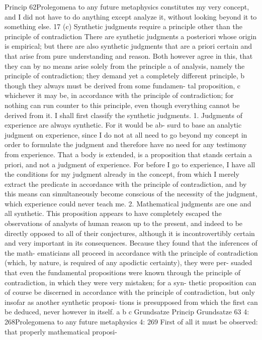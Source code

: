 Princip
62Prolegomena to any future metaphysics
constitutes my very concept, and I did not have to do anything except
analyze it, without looking beyond it to something else. 17
(c) Synthetic judgments require a principle other than
the principle of contradiction
There are synthetic judgments a posteriori whose origin is empirical; but
there are also synthetic judgments that are a priori certain and that arise
from pure understanding and reason. Both however agree in this, that
they can by no means arise solely from the principle a of analysis, namely
the principle of contradiction; they demand yet a completely different
principle, b though they always must be derived from some fundamen-
tal proposition, c whichever it may be, in accordance with the principle of
contradiction; for nothing can run counter to this principle, even though
everything cannot be derived from it. I shall ﬁrst classify the synthetic
judgments.
1. Judgments of experience are always synthetic. For it would be ab-
surd to base an analytic judgment on experience, since I do not at all
need to go beyond my concept in order to formulate the judgment and
therefore have no need for any testimony from experience. That a body is
extended, is a proposition that stands certain a priori, and not a judgment
of experience. For before I go to experience, I have all the conditions
for my judgment already in the concept, from which I merely extract
the predicate in accordance with the principle of contradiction, and by
this means can simultaneously become conscious of the necessity of the
judgment, which experience could never teach me.
2. Mathematical judgments are one and all synthetic. This proposition
appears to have completely escaped the observations of analysts of human
reason up to the present, and indeed to be directly opposed to all of their
conjectures, although it is incontrovertibly certain and very important
in its consequences. Because they found that the inferences of the math-
ematicians all proceed in accordance with the principle of contradiction
(which, by nature, is required of any apodictic certainty), they were per-
suaded that even the fundamental propositions were known through the
principle of contradiction, in which they were very mistaken; for a syn-
thetic proposition can of course be discerned in accordance with the
principle of contradiction, but only insofar as another synthetic proposi-
tions is presupposed from which the ﬁrst can be deduced, never however
in itself.
a
b
c
Grundsatze
Princip
Grundsatze
63
4: 268Prolegomena to any future metaphysics
4: 269
First of all it must be observed: that properly mathematical proposi-
